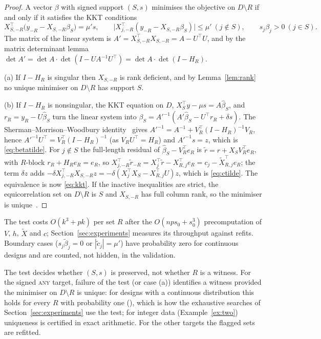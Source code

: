 \documentclass[10pt,a4paper]{article}
\theoremstyle{plain}
\theoremstyle{definition}
\theoremstyle{remark}
\newcommand{\Dm}{D\setminus R}
\newcommand{\tsc}[1]{\textnormal{\textsc{#1}}}  %
\begin{document}
\begin{proof}
A vector $\beta$ with signed support $(S,s)$ minimises the objective on $\Dm$ if and only if it satisfies the KKT conditions
\begin{equation}\label{eq:kkt}
X_{S,-R}^{\top}\bigl(y_{-R}-X_{S,-R}\beta_S\bigr)=\mu's,\qquad \bigl|X_{j,-R}^{\top}(y_{-R}-X_{S,-R}\beta_S)\bigr|\le\mu'\ (j\notin S),\qquad s_j\beta_j>0\ (j\in S).
\end{equation}
The matrix of the linear system is $A'=X_{S,-R}^{\top}X_{S,-R}=A-U^{\top}U$, and by the matrix determinant lemma $\det A'=\det A\cdot\det(I-UA^{-1}U^{\top})=\det A\cdot\det(I-H_R)$.

(a) If $I-H_R$ is singular then $X_{S,-R}$ is rank deficient, and by Lemma~\ref{lem:rank} no unique minimiser on $\Dm$ has support $S$.

(b) If $I-H_R$ is nonsingular, the KKT equation on $D$, $X_S^{\top}y-\mu s=A\hat\beta_S$, and $r_R=y_R-U\hat\beta_S$ turn the linear system into $\beta_S=A'^{-1}(A'\hat\beta_S-U^{\top}r_R+\delta s)$. The Sherman--Morrison--Woodbury identity~\citep{sherman1950,woodbury1950,hager1989} gives $A'^{-1}=A^{-1}+V_R^{\top}(I-H_R)^{-1}V_R$, hence $A'^{-1}U^{\top}=V_R^{\top}(I-H_R)^{-1}$ (as $V_RU^{\top}=H_R$) and $A'^{-1}s=z$, which is \eqref{eq:betatilde}. For $j\notin S$ the full-length residual of $\hat\beta_S-V_R^{\top}e_R$ is $\tilde r=r+X_SV_R^{\top}e_R$, with $R$-block $r_R+H_Re_R=e_R$, so $X_{j,-R}^{\top}\tilde r_{-R}=X_j^{\top}\tilde r-X_{R,j}^{\top}e_R=c_j-\tilde X_{R,j}^{\top}e_R$; the term $\delta z$ adds $-\delta X_{j,-R}^{\top}X_{S,-R}z=-\delta(X_j^{\top}X_S-X_{R,j}^{\top}U)z$, which is \eqref{eq:ctilde}. The equivalence is now \eqref{eq:kkt}. If the inactive inequalities are strict, the equicorrelation set on $\Dm$ is $S$ and $X_{S,-R}$ has full column rank, so the minimiser is unique~\citep{tibshirani2013}.
\end{proof}

The test costs $O(k^3+pk)$ per set $R$ after the $O(nps_0+s_0^3)$ precomputation of $V$, $h$, $\tilde X$ and $c$; Section~\ref{sec:experiments} measures its throughput against refits. Boundary cases ($s_j\tilde\beta_j=0$ or $|\tilde c_j|=\mu'$) have probability zero for continuous designs and are counted, not hidden, in the validation.

The test decides whether $(S,s)$ is preserved, not whether $R$ is a witness. For the signed \tsc{any} target, failure of the test (or case (a)) identifies a witness provided the minimiser on $\Dm$ is unique: for designs with a continuous distribution this holds for every $R$ with probability one (\citealp{tibshirani2013}), which is how the exhaustive searches of Section~\ref{sec:experiments} use the test; for integer data (Example~\ref{ex:two}) uniqueness is certified in exact arithmetic. For the other targets the flagged sets are refitted.
\end{document}
